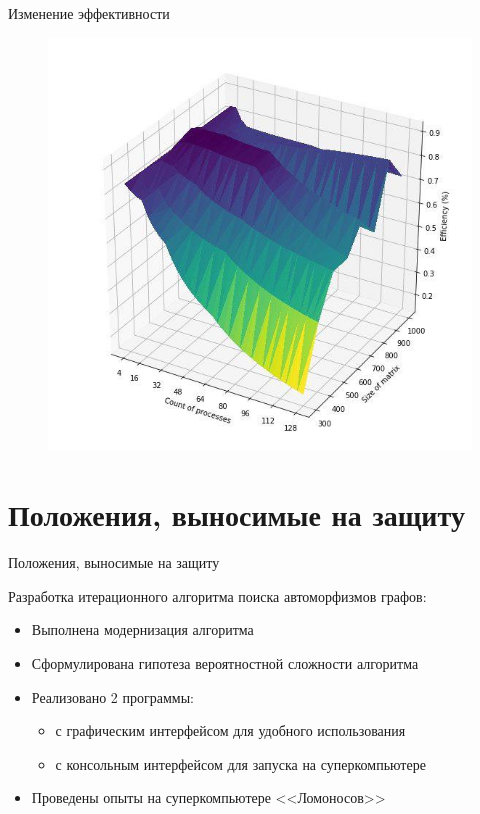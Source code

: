 \documentclass{beamer}
\begin{document}
\begin{frame}{Изменение эффективности}

\begin{figure}[ht]
\centering 
    \includegraphics[scale=0.4]{../image/ef.jpg}
\end{figure}

\end{frame}


\section{Положения, выносимые на защиту}
\begin{frame}{Положения, выносимые на защиту}

Разработка итерационного алгоритма поиска автоморфизмов графов:
\begin{itemize}
\item Выполнена модернизация алгоритма
\item Сформулирована гипотеза вероятностной сложности алгоритма
\item Реализовано 2 программы:
\begin{itemize}
\item с графическим интерфейсом для удобного использования
\item с консольным интерфейсом для запуска на суперкомпьютере
\end{itemize}
\item Проведены опыты на суперкомпьютере <<Ломоносов>>
\end{itemize}

\end{frame}
\end{document}
